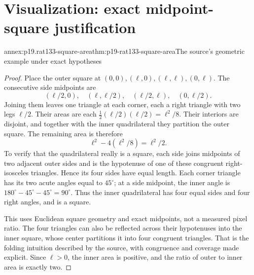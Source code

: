 \section{Visualization: exact midpoint-square justification}
\label{annex:p19-rat133-midpoint-square}

\begin{annexitem}{annex:p19.rat133-square-area}{thm:p19-rat133-square-area}{The source's geometric example under exact hypotheses}
\begin{proof}
Place the outer square at \((0,0),(\ell,0),(\ell,\ell),(0,\ell)\).
The consecutive side midpoints are
\[
 (\ell/2,0),\quad(\ell,\ell/2),\quad
 (\ell/2,\ell),\quad(0,\ell/2).
\]
Joining them leaves one triangle at each corner, each a right triangle
with two legs \(\ell/2\). Their areas are each
\(\frac12(\ell/2)(\ell/2)=\ell^2/8\). Their interiors are disjoint,
and together with the inner quadrilateral they partition the outer square.
The remaining area is therefore
\[
             \ell^2-4(\ell^2/8)=\ell^2/2.
\]
To verify that the quadrilateral really is a square, each side joins
midpoints of two adjacent outer sides and is the hypotenuse of one of
these congruent right-isosceles triangles. Hence its four sides have equal
length. Each corner triangle has its two acute angles equal to
\(45^\circ\); at a side midpoint, the inner angle is
\(180^\circ-45^\circ-45^\circ=90^\circ\). Thus the inner
quadrilateral has four equal sides and four right angles, and is a square.

This uses Euclidean square geometry and exact midpoints, not a measured
pixel ratio. The four triangles can also be reflected across their
hypotenuses into the inner square, whose center partitions it into four
congruent triangles. That is the folding intuition described by the source,
with congruence and coverage made explicit. Since \(\ell>0\), the
inner area is positive, and the ratio of outer to inner area is exactly two.
\end{proof}
\end{annexitem}
